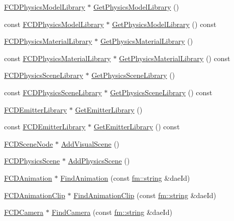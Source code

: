 \begin{DoxyCompactItemize}
\item 
\hyperlink{classFCDLibrary}{FCDPhysicsModelLibrary} $\ast$ \hyperlink{classFCDocument_afa546a6ec51139a8403eb347e60e324d}{GetPhysicsModelLibrary} ()
\item 
const \hyperlink{classFCDLibrary}{FCDPhysicsModelLibrary} $\ast$ \hyperlink{classFCDocument_a42cd510b635b0b70b6d0897281bc2bc7}{GetPhysicsModelLibrary} () const 
\item 
\hyperlink{classFCDLibrary}{FCDPhysicsMaterialLibrary} $\ast$ \hyperlink{classFCDocument_a9113c4ecdce4f1c0386c8840bace0149}{GetPhysicsMaterialLibrary} ()
\item 
const \hyperlink{classFCDLibrary}{FCDPhysicsMaterialLibrary} $\ast$ \hyperlink{classFCDocument_ab44faa0974e38b742b3ee3d98c4fc800}{GetPhysicsMaterialLibrary} () const 
\item 
\hyperlink{classFCDLibrary}{FCDPhysicsSceneLibrary} $\ast$ \hyperlink{classFCDocument_ab305ac355eb6300cc02c30644e55843c}{GetPhysicsSceneLibrary} ()
\item 
const \hyperlink{classFCDLibrary}{FCDPhysicsSceneLibrary} $\ast$ \hyperlink{classFCDocument_a109715cb032dca9fef65727596818f82}{GetPhysicsSceneLibrary} () const 
\item 
\hyperlink{classFCDLibrary}{FCDEmitterLibrary} $\ast$ \hyperlink{classFCDocument_a15ee5f11dabf8044baef69b6c1cfac71}{GetEmitterLibrary} ()
\item 
const \hyperlink{classFCDLibrary}{FCDEmitterLibrary} $\ast$ \hyperlink{classFCDocument_a239251cc9a1611c02f1585ffef016ca1}{GetEmitterLibrary} () const 
\item 
\hyperlink{classFCDSceneNode}{FCDSceneNode} $\ast$ \hyperlink{classFCDocument_ac71e1b787b466ff984346b3bb02b6163}{AddVisualScene} ()
\item 
\hyperlink{classFCDPhysicsScene}{FCDPhysicsScene} $\ast$ \hyperlink{classFCDocument_a24737ce2476c0fa28b003e0fc81912da}{AddPhysicsScene} ()
\item 
\hyperlink{classFCDAnimation}{FCDAnimation} $\ast$ \hyperlink{classFCDocument_a484751e2b56e02f370ef3080e71cdd4d}{FindAnimation} (const \hyperlink{classfm_1_1stringT}{fm::string} \&daeId)
\item 
\hyperlink{classFCDAnimationClip}{FCDAnimationClip} $\ast$ \hyperlink{classFCDocument_ae25e41f3b284cfa8f50d0574344041b8}{FindAnimationClip} (const \hyperlink{classfm_1_1stringT}{fm::string} \&daeId)
\item 
\hyperlink{classFCDCamera}{FCDCamera} $\ast$ \hyperlink{classFCDocument_af69744f4d0d462616784dbe25a94dd2e}{FindCamera} (const \hyperlink{classfm_1_1stringT}{fm::string} \&daeId)

\end{DoxyCompactItemize}
